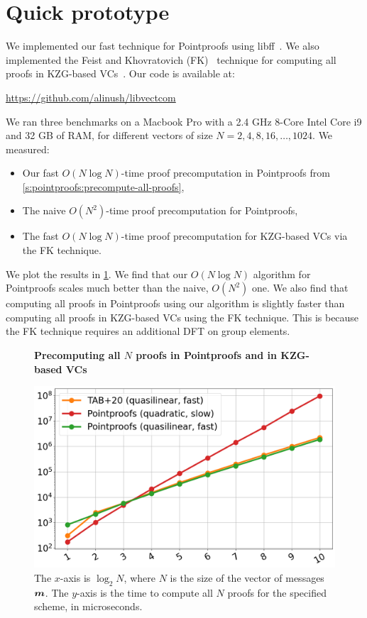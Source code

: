 \section{Quick prototype}

We implemented our fast technique for Pointproofs using \textsf{libff}~\cite{libff}.
We also implemented the Feist and Khovratovich (FK)~\cite{FK20} technique for computing all proofs in KZG-based VCs~\cite{TAB+20}.
Our code is available at:
\begin{center}
    \url{https://github.com/alinush/libvectcom}
\end{center}

\noindent We ran three benchmarks on a Macbook Pro with a 2.4 GHz 8-Core Intel Core i9 and 32 GB of RAM, for different vectors of size $N=2,4,8,16,\dots,1024$.
We measured:
\begin{itemize}
    \item Our fast $O(N\log{N})$-time proof precomputation in Pointproofs from \cref{s:pointproofs:precompute-all-proofs},
    \item The naive $O(N^2)$-time proof precomputation for Pointproofs,
    \item The fast $O(N\log{N})$-time proof precomputation for KZG-based VCs via the FK technique.
\end{itemize}

\noindent We plot the results in \cref{f:benchmarks}.
We find that our $O(N\log{N})$ algorithm for Pointproofs scales much better than the naive, $O(N^2)$ one.
We also find that computing all proofs in Pointproofs using our algorithm is slightly faster than computing all proofs in KZG-based VCs using the FK technique.
This is because the FK technique requires an additional DFT on group elements.

\begin{figure}[t]
    \centering
    \textbf{Precomputing all $N$ proofs in Pointproofs and in KZG-based VCs}
    \par
    \medskip
    \includegraphics[width=0.50\columnwidth]{fk-vs-pointproofs.png}
    \caption{
        The $x$-axis is $\log_2{N}$, where $N$ is the size of the vector of messages $\bm{m}$.
        The $y$-axis is the time to compute all $N$ proofs for the specified scheme, in microseconds.
    }
    \label{f:benchmarks}
\end{figure}
